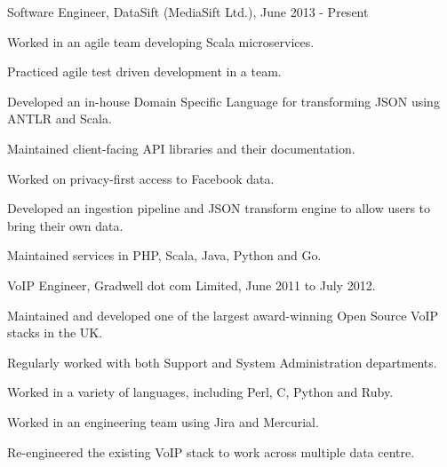 \documentclass[a4paper]{article}
\renewenvironment{itemize}{
  \begin{list}{}{
    \setlength{\leftmargin}{1.5em}
  }
}{
  \end{list}
}
\newenvironment{packed}{
\begin{itemize}
  \setlength{\itemsep}{0pt}
  \setlength{\parskip}{0pt}
  \setlength{\parsep}{0pt}
}{\end{itemize}}
\begin{document}
\begin{itemize}
\item Software Engineer, DataSift (MediaSift Ltd.), June 2013 - Present
        \begin{packed}
            \item Worked in an agile team developing Scala microservices.
            \item Practiced agile test driven development in a team.
            \item Developed an in-house Domain Specific Language for transforming JSON using ANTLR and Scala.
            \item Maintained client-facing API libraries and their documentation.
            \item Worked on privacy-first access to Facebook data.
            \item Developed an ingestion pipeline and JSON transform engine to allow users to bring their own data.
            \item Maintained services in PHP, Scala, Java, Python and Go.
        \end{packed}
\end{itemize}

\begin{itemize}
\item VoIP Engineer, Gradwell dot com Limited, June 2011 to July 2012.
        \begin{packed}
            \item Maintained and developed one of the largest award-winning Open Source VoIP stacks in the UK.
            \item Regularly worked with both Support and System Administration departments.
            \item Worked in a variety of languages, including Perl, C, Python and Ruby.
            \item Worked in an engineering team using Jira and Mercurial.
            \item Re-engineered the existing VoIP stack to work across multiple data centre.
        \end{packed}
\end{itemize}
\end{document}
